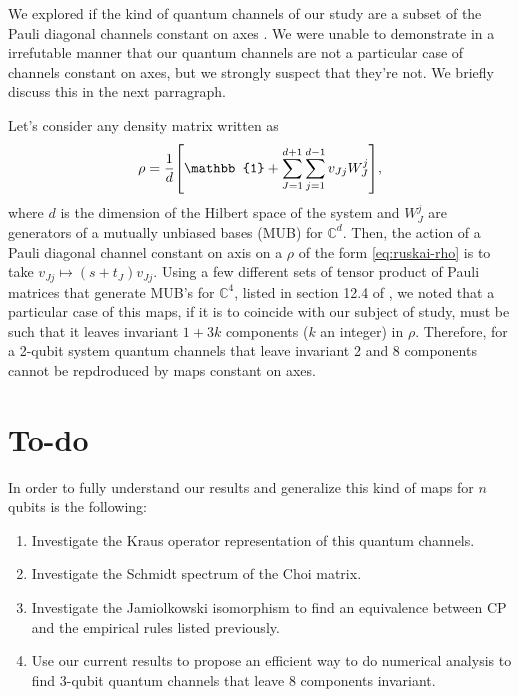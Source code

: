 \documentclass[11pt,dvipsnames]{article}
\begin{document}
We explored if the kind of quantum channels of our study are a subset 
of the Pauli diagonal channels constant on axes \cite{nathanson2007pauli}.
We were unable to demonstrate in a irrefutable manner that 
our quantum channels are not a particular case of channels constant on axes, 
but we strongly suspect that they're not. We briefly discuss this in the 
next parragraph. 

Let's consider any density matrix written as
\begin{align}
	\rho = \frac{1}{d}\qty[\mathbb{1} + \sum _{J=1}^{d+1} \sum _{j=1}^{d-1}
	v_{Jj}W_J^j],
	\label{eq:ruskai-rho}
\end{align}
where $d$ is the dimension of the Hilbert space of the system and $W_J^j$ 
are generators of a mutually unbiased bases (MUB) for $\mathbb{C}^{d}$. Then,
the action of a Pauli diagonal channel constant on axis on a $\rho$ of the form
\eqref{eq:ruskai-rho} is to take $v_{Jj}\mapsto (s+t_J)v_{Jj}$. Using a few
different sets of tensor product of Pauli matrices that generate MUB's for
$\mathbb{C}^4$, listed in section 12.4 of \cite{bengtsson_zyczkowski_2017}, 
we noted that a particular case of this maps, if it is to coincide with our subject of
study, must be such that it leaves invariant $1+3k$ components ($k$ an integer)
in $\rho$. Therefore, for a 2-qubit system quantum channels that leave 
invariant 2 and 8 components cannot be repdroduced by maps constant on axes. 

\section*{To-do}
In order to fully understand our results and generalize this kind of maps 
for $n$ qubits is the following:
\begin{enumerate}
	\item Investigate the Kraus operator representation of this quantum channels.
	\item Investigate the Schmidt spectrum of the Choi matrix.
	\item Investigate the Jamiolkowski isomorphism to find an equivalence
				between CP and the empirical rules listed previously.
	\item Use our current results to propose an efficient way to do numerical
				analysis to find 3-qubit quantum channels that leave 8 components 
				invariant.
\end{enumerate}



\vfill
\end{document}
